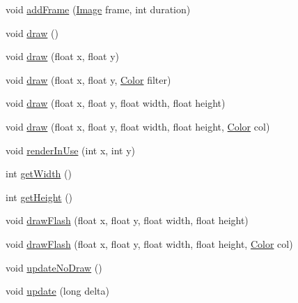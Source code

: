 \begin{DoxyCompactItemize}
void \mbox{\hyperlink{classorg_1_1newdawn_1_1slick_1_1_animation_ad9efe0ce552758593355b13f4e3a9860}{add\+Frame}} (\mbox{\hyperlink{classorg_1_1newdawn_1_1slick_1_1_image}{Image}} frame, int duration)
\item 
void \mbox{\hyperlink{classorg_1_1newdawn_1_1slick_1_1_animation_a7ff3b50dcc4c72c83ada402daa6fe5f3}{draw}} ()
\item 
void \mbox{\hyperlink{classorg_1_1newdawn_1_1slick_1_1_animation_a37ae4bfbc6158fade8e1e7efdde039af}{draw}} (float x, float y)
\item 
void \mbox{\hyperlink{classorg_1_1newdawn_1_1slick_1_1_animation_a28430525e42aa144e3d2c88fdaa2803c}{draw}} (float x, float y, \mbox{\hyperlink{classorg_1_1newdawn_1_1slick_1_1_color}{Color}} filter)
\item 
void \mbox{\hyperlink{classorg_1_1newdawn_1_1slick_1_1_animation_ac04efbf70b97008ea94861d41fb74b8a}{draw}} (float x, float y, float width, float height)
\item 
void \mbox{\hyperlink{classorg_1_1newdawn_1_1slick_1_1_animation_acf72d8975626409c5183164de6161ff1}{draw}} (float x, float y, float width, float height, \mbox{\hyperlink{classorg_1_1newdawn_1_1slick_1_1_color}{Color}} col)
\item 
void \mbox{\hyperlink{classorg_1_1newdawn_1_1slick_1_1_animation_a16cb030adb6e9533d686546a6f54e21d}{render\+In\+Use}} (int x, int y)
\item 
int \mbox{\hyperlink{classorg_1_1newdawn_1_1slick_1_1_animation_a98c530ffd6f3d78324fb7fdbf99e1575}{get\+Width}} ()
\item 
int \mbox{\hyperlink{classorg_1_1newdawn_1_1slick_1_1_animation_aff46e9d56b098ef31409d2b017538dad}{get\+Height}} ()
\item 
void \mbox{\hyperlink{classorg_1_1newdawn_1_1slick_1_1_animation_a7877c17534e027b170d1857c09401c91}{draw\+Flash}} (float x, float y, float width, float height)
\item 
void \mbox{\hyperlink{classorg_1_1newdawn_1_1slick_1_1_animation_ad78156e8b114c6f4c3a0f1b5ae594669}{draw\+Flash}} (float x, float y, float width, float height, \mbox{\hyperlink{classorg_1_1newdawn_1_1slick_1_1_color}{Color}} col)
\item 
void \mbox{\hyperlink{classorg_1_1newdawn_1_1slick_1_1_animation_a3796e0478490ad66b899fb94f19e0898}{update\+No\+Draw}} ()
\item 
void \mbox{\hyperlink{classorg_1_1newdawn_1_1slick_1_1_animation_a24420dcd4e89ff617ed52a265e014ba5}{update}} (long delta)
\item 

\end{DoxyCompactItemize}
